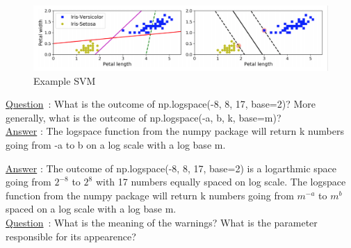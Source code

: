 \begin{figure}[ht]
	\centering 
	\includegraphics[scale = 0.35]{Pics/SVM}
	\caption{Example SVM}
\end{figure}

\underline{Question} : What is the outcome of np.logspace(-8, 8, 17, base=2)? More generally, what is the outcome of np.logspace(-a, b, k, base=m)?\\


\underline{Answer} : The logspace function from the numpy package will return k numbers going from -a to b on a log scale with a log base m. 

\underline{Answer} : The outcome of np.logspace(-8, 8, 17, base=2) is a logarthmic space going from $2^{-8}$ to $2^8$ with 17 numbers equally spaced on log scale.
 The logspace function from the numpy package will return k numbers going from $m^{-a}$ to $m^b$ spaced on a log scale with a log base m. \\

\underline{Question} : What is the meaning of the warnings? What is the parameter responsible for its appearence? \\


